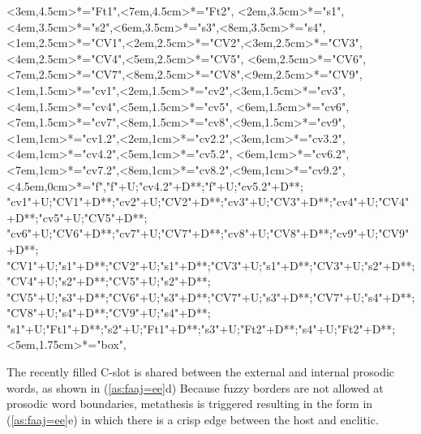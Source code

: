 \begin{multicols}{2}
\begin{exe}
{\begin{xlist}
{		<3em,4.5cm>*="Ft1",<7em,4.5cm>*="Ft2",
		<2em,3.5cm>*="s1",<4em,3.5cm>*="s2",<6em,3.5cm>*="s3",<8em,3.5cm>*="s4",
		<1em,2.5cm>*="CV1",<2em,2.5cm>*="CV2",<3em,2.5cm>*="CV3",<4em,2.5cm>*="CV4",<5em,2.5cm>*="CV5",
		<6em,2.5cm>*="CV6",<7em,2.5cm>*="CV7",<8em,2.5cm>*="CV8",<9em,2.5cm>*="CV9",
		<1em,1.5cm>*="cv1",<2em,1.5cm>*="cv2",<3em,1.5cm>*\as{ }="cv3",<4em,1.5cm>*="cv4",<5em,1.5cm>*\as{\j}="cv5",
		<6em,1.5cm>*="cv6",<7em,1.5cm>*\as{ }="cv7",<8em,1.5cm>*="cv8",<9em,1.5cm>*\as{ }="cv9",
		<1em,1cm>*="cv1.2",<2em,1cm>*="cv2.2",<3em,1cm>*\as{ }="cv3.2",<4em,1cm>*="cv4.2",<5em,1cm>*\as{\j}="cv5.2",
		<6em,1cm>*="cv6.2",<7em,1cm>*\as{ }="cv7.2",<8em,1cm>*="cv8.2",<9em,1cm>*\as{ }="cv9.2",
		<4.5em,0cm>*\as{\tsc{[+fr.]}}="f","f"+U;"cv4.2"+D**\dir{-};"f"+U;"cv5.2"+D**\dir{-};
		"cv1"+U;"CV1"+D**\dir{-};"cv2"+U;"CV2"+D**\dir{-};"cv3"+U;"CV3"+D**\dir{};"cv4"+U;"CV4"+D**\dir{-};"cv5"+U;"CV5"+D**\dir{-};
		"cv6"+U;"CV6"+D**\dir{-};"cv7"+U;"CV7"+D**\dir{};"cv8"+U;"CV8"+D**\dir{-};"cv9"+U;"CV9"+D**\dir{};
		"CV1"+U;"s1"+D**\dir{-};"CV2"+U;"s1"+D**\dir{-};"CV3"+U;"s1"+D**\dir{-};"CV3"+U;"s2"+D**\dir{-};"CV4"+U;"s2"+D**\dir{-};"CV5"+U;"s2"+D**\dir{-};
		"CV5"+U;"s3"+D**\dir{-};"CV6"+U;"s3"+D**\dir{-};"CV7"+U;"s3"+D**\dir{-};"CV7"+U;"s4"+D**\dir{-};"CV8"+U;"s4"+D**\dir{-};"CV9"+U;"s4"+D**\dir{-};
		"s1"+U;"Ft1"+D**\dir{-};"s2"+U;"Ft1"+D**\dir{-};"s3"+U;"Ft2"+D**\dir{-};"s4"+U;"Ft2"+D**\dir{-};
		<5em,1.75cm>*="box",
	\endxy}\label{as:faaj=ee2}
	\end{xlist}}
\end{exe}
\end{multicols}

The recently filled C-slot is shared between the external and internal prosodic words,
as shown in (\ref{as:faaj=ee}d)
Because fuzzy borders are not allowed at prosodic word boundaries,
metathesis is triggered resulting in the form in (\ref{as:faaj=ee}e) in which
there is a crisp edge between the host and enclitic.

